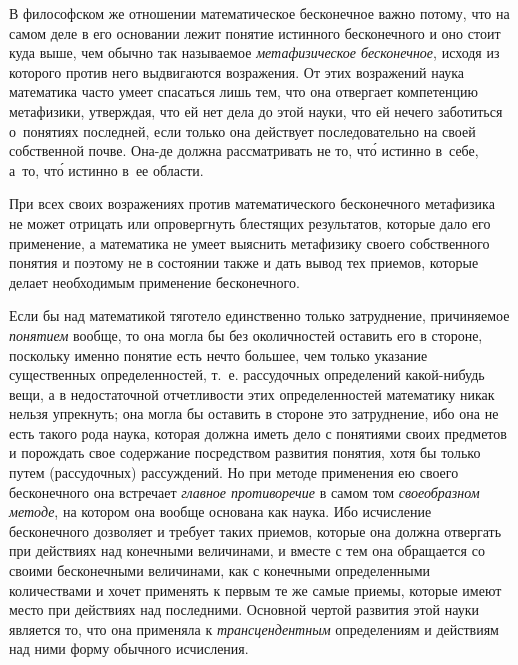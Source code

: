 В философском же отношении математическое бесконечное важно потому, что на
самом деле в его основании лежит понятие истинного бесконечного и оно стоит
куда выше, чем обычно так называемое {\em метафизическое бесконечное}, исходя
из которого против него выдвигаются возражения. От этих возражений наука
математика часто умеет спасаться лишь тем, что она отвергает компетенцию
метафизики, утверждая, что ей нет дела до этой науки, что ей нечего
заботиться о~понятиях последней, если только она действует последовательно
на своей собственной почве. Она-де должна рассматривать не то, чт\'{о}
истинно в~себе, а~то, чт\'{о} истинно в~ее области.

При всех своих возражениях против математического бесконечного метафизика не
может отрицать или опровергнуть блестящих результатов, которые дало его
применение, а математика не умеет выяснить метафизику своего собственного
понятия и поэтому не в состоянии также и дать вывод тех приемов, которые
делает необходимым применение бесконечного.

Если бы над математикой тяготело единственно только затруднение, причиняемое
{\em понятием} вообще, то она могла бы без околичностей оставить его в стороне,
поскольку именно понятие есть нечто большее, чем только указание существенных
определенностей, т.~е. рассудочных определений какой-нибудь вещи, а в
недостаточной отчетливости этих определенностей математику никак нельзя
упрекнуть; она могла бы оставить в стороне это затруднение, ибо она не есть
такого рода наука, которая должна иметь дело с понятиями своих предметов и
порождать свое содержание посредством развития понятия, хотя бы только путем
(рассудочных) рассуждений. Но при методе применения ею своего бесконечного она
встречает {\em главное противоречие} в самом том {\em своеобразном методе}, на
котором она вообще основана как наука. Ибо исчисление бесконечного дозволяет и
требует таких приемов, которые она должна отвергать при действиях над конечными
величинами, и вместе с тем она обращается со своими бесконечными величинами,
как с конечными определенными количествами и хочет применять к первым те же
самые приемы, которые имеют место при действиях над последними. Основной чертой
развития этой науки является то, что она применяла к {\em трансцендентным}
определениям и действиям над ними форму обычного исчисления.

